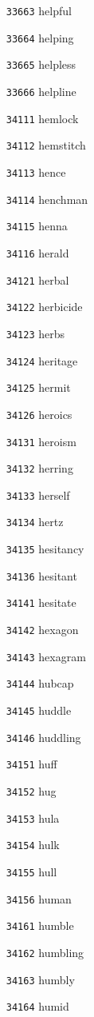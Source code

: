 \documentclass[twoside,11pt]{article}
\begin{document}
\begin{multicols}{5}
\begin{enumerate}
\item[\texttt{33663}] helpful
\item[\texttt{33664}] helping
\item[\texttt{33665}] helpless
\item[\texttt{33666}] helpline
\item[\texttt{34111}] hemlock
\item[\texttt{34112}] hemstitch
\item[\texttt{34113}] hence
\item[\texttt{34114}] henchman
\item[\texttt{34115}] henna
\item[\texttt{34116}] herald
\item[\texttt{34121}] herbal
\item[\texttt{34122}] herbicide
\item[\texttt{34123}] herbs
\item[\texttt{34124}] heritage
\item[\texttt{34125}] hermit
\item[\texttt{34126}] heroics
\item[\texttt{34131}] heroism
\item[\texttt{34132}] herring
\item[\texttt{34133}] herself
\item[\texttt{34134}] hertz
\item[\texttt{34135}] hesitancy
\item[\texttt{34136}] hesitant
\item[\texttt{34141}] hesitate
\item[\texttt{34142}] hexagon
\item[\texttt{34143}] hexagram
\item[\texttt{34144}] hubcap
\item[\texttt{34145}] huddle
\item[\texttt{34146}] huddling
\item[\texttt{34151}] huff
\item[\texttt{34152}] hug
\item[\texttt{34153}] hula
\item[\texttt{34154}] hulk
\item[\texttt{34155}] hull
\item[\texttt{34156}] human
\item[\texttt{34161}] humble
\item[\texttt{34162}] humbling
\item[\texttt{34163}] humbly
\item[\texttt{34164}] humid

\end{enumerate}
\end{multicols}
\end{document}
